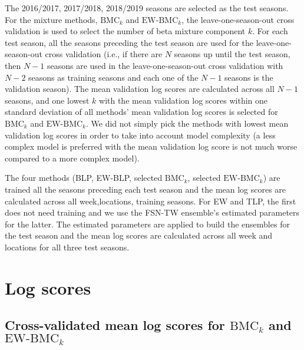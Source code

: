 \documentclass[
]{article}
\begin{document}
The 2016/2017, 2017/2018, 2018/2019 seasons are selected as the test
seasons. For the mixture methods, \(\text{BMC}_k\) and
\(\text{EW-BMC}_k\), the leave-one-season-out cross validation is used
to select the number of beta mixture component \(k\). For each test
season, all the seasons preceding the test season are used for the
leave-one-season-out cross validation (i.e., if there are \(N\) seasons
up until the test season, then \(N-1\) seasons are used in the
leave-one-season-out cross validation with \(N-2\) seasons as training
seasons and each one of the \(N-1\) seasons is the validation season).
The mean validation log scores are calculated across all \(N-1\)
seasons, and one lowest \(k\) with the mean validation log scores within
one standard deviation of all methods' mean validation log scores is
selected for \(\text{BMC}_k\) and \(\text{EW-BMC}_k\). We did not simply
pick the methods with lowest mean validation log scores in order to take
into account model complexity (a less complex model is preferred with
the mean validation log score is not much worse compared to a more
complex model).

The four methods (BLP, EW-BLP, selected \(\text{BMC}_k\), selected
\(\text{EW-BMC}_k\)) are trained all the seasons preceding each test
season and the mean log scores are calculated across all week,locations,
training seasons. For EW and TLP, the first does not need training and
we use the FSN-TW ensemble's estimated parameters for the latter. The
estimated parameters are applied to build the ensembles for the test
season and the mean log scores are calculated across all week and
locations for all three test seasons.

\hypertarget{log-scores}{%
\section{Log scores}\label{log-scores}}

\hypertarget{cross-validated-mean-log-scores-for-textbmc_k-and-textew-bmc_k}{%
\subsection{\texorpdfstring{Cross-validated mean log scores for
\(\text{BMC}_k\) and
\(\text{EW-BMC}_k\)}{Cross-validated mean log scores for \textbackslash text\{BMC\}\_k and \textbackslash text\{EW-BMC\}\_k}}\label{cross-validated-mean-log-scores-for-textbmc_k-and-textew-bmc_k}}
\end{document}
